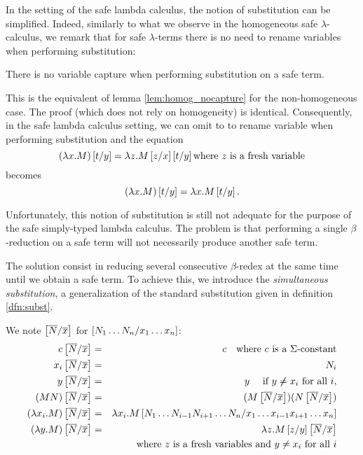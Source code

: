 In the setting of the safe lambda calculus, the notion of
substitution can be simplified. Indeed, similarly to what we observe in the homogeneous
safe $\lambda$-calculus, we remark that for safe
$\lambda$-terms there is no need to rename variables when performing
substitution:

\begin{lem}
\label{lem:noclash} There is no variable capture when performing
substitution on a safe term.
\end{lem}

This is the equivalent of lemma \ref{lem:homog_nocapture} for the non-homogeneous case. The proof (which does not rely on homogeneity)
is identical.
Consequently, in the safe lambda calculus setting, we can omit to to rename
variable when performing substitution and the equation
$$(\lambda x . M) \left[ t/y \right] = \lambda z . M \left[ z/x \right]
\left[ t/y \right] \mbox{where $z$ is a fresh variable}$$ becomes
$$(\lambda x . M) \left[ t/y \right] = \lambda x . M \left[ t/y \right].$$

Unfortunately, this notion of substitution is still not adequate for
the purpose of the safe simply-typed lambda calculus. The problem is
that performing a single $\beta$-reduction on a safe term will not
necessarily produce another safe term.

The solution consist in reducing several consecutive $\beta$-redex at the same time until we obtain a safe
term. To achieve this, we introduce the \emph{simultaneous substitution},
a generalization of the standard substitution given in definition \ref{dfn:subst}.

\begin{dfn}
\label{dnf:simsubst}
 We note $\left[ \overline{N}/\overline{x} \right]$ for $\left[ N_1 \ldots N_n/x_1
\ldots x_n \right]$:
\begin{eqnarray*}
c \left[ \overline{N}/\overline{x} \right] &=& c \quad \mbox{where $c$ is a $\Sigma$-constant}\\
x_i \left[ \overline{N}/\overline{x} \right] &=& N_i\\
 y \left[ \overline{N}/\overline{x} \right] &=& y \quad \mbox{ if } y \not \neq x_i \mbox{ for all } i,\\
(M N) \left[ \overline{N}/\overline{x} \right] &=& (M \left[ \overline{N}/\overline{x} \right]) (N \left[ \overline{N}/\overline{x} \right]) \\
(\lambda x_i . M) \left[ \overline{N}/\overline{x} \right] &=& \lambda x_i
. M
\left[ N_1 \ldots N_{i-1} N_{i+1}\ldots N_n/x_1 \ldots x_{i-1} x_{i+1}\ldots x_n \right] \\
(\lambda y . M)
\left[ \overline{N}/\overline{x} \right] &=& \lambda z . M \left[ z/y \right] \left[ \overline{N}/\overline{x} \right] \\
&& \mbox{where $z$ is a fresh variables and } y \neq x_i \mbox{ for
all } i
\end{eqnarray*}
\end{dfn}

